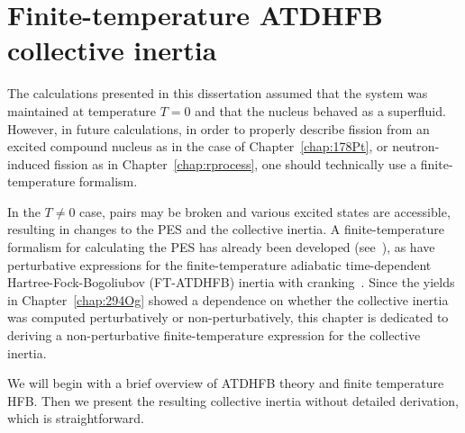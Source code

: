 \chapter{Finite-temperature ATDHFB collective inertia}\label{append:TD-ATDHFB}




The calculations presented in this dissertation assumed that the system was maintained at temperature $T=0$ and that the nucleus behaved as a superfluid. However, in future calculations, in order to properly describe fission from an excited compound nucleus as in the case of Chapter~\ref{chap:178Pt}, or neutron-induced fission as in Chapter~\ref{chap:rprocess}, one should technically use a finite-temperature formalism.

In the $T\neq0$ case, pairs may be broken and various excited states are accessible, resulting in changes to the PES and the collective inertia. A finite-temperature formalism for calculating the PES has already been developed (see~\cite{Schunck2015b, Mcdonnell2014}), as have perturbative expressions for the finite-temperature adiabatic time-dependent Hartree-Fock-Bogoliubov (FT-ATDHFB) inertia with cranking~\cite{Egido1986, Martin2009, Schunck2019edf}. Since the yields in Chapter~\ref{chap:294Og} showed a dependence on whether the collective inertia was computed perturbatively or non-perturbatively, this chapter is dedicated to deriving a non-perturbative finite-temperature expression for the collective inertia.

We will begin with a brief overview of ATDHFB theory and finite temperature HFB. Then we present the resulting collective inertia without detailed derivation, which is straightforward.



